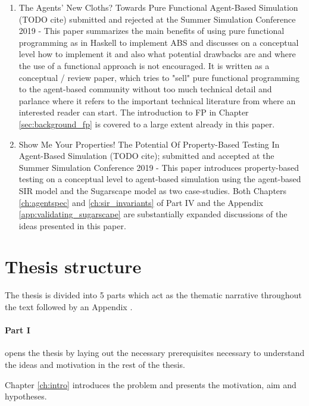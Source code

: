 \begin{enumerate}
	\item The Agents' New Cloths? Towards Pure Functional Agent-Based Simulation (TODO cite) submitted and rejected at the Summer Simulation Conference 2019 - This paper summarizes the main benefits of using pure functional programming as in Haskell to implement ABS and discusses on a conceptual level how to implement it and also what potential drawbacks are and where the use of a functional approach is not encouraged. It is written as a conceptual / review paper, which tries to "sell" pure functional programming to the agent-based community without too much technical detail and parlance where it refers to the important technical literature from where an interested reader can start. The introduction to FP in Chapter \ref{sec:background_fp} is covered to a large extent already in this paper.
	
	\item Show Me Your Properties! The Potential Of Property-Based Testing In Agent-Based Simulation (TODO cite); submitted and accepted at the Summer Simulation Conference 2019 - This paper introduces property-based testing on a conceptual level to agent-based simulation using the agent-based SIR model and the Sugarscape model as two case-studies. Both Chapters 
\ref{ch:agentspec} and \ref{ch:sir_invariants} of Part IV and the Appendix \ref{app:validating_sugarscape} are substantially expanded discussions of the ideas presented in this paper.
\end{enumerate}


\section{Thesis structure}

The thesis is divided into 5 parts which act as the thematic narrative throughout the text followed by an Appendix . 

\paragraph{Part I} opens the thesis by laying out the necessary prerequisites necessary to understand the ideas and motivation in the rest of the thesis.
\medskip

Chapter \ref{ch:intro} introduces the problem and presents the motivation, aim and hypotheses.

